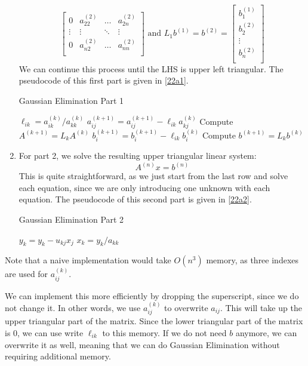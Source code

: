 \documentclass[../main/main.tex]{subfiles}
\begin{document}
\begin{enumerate}
\[\begin{bmatrix}
   0& a_{22}^{(2)} & \ldots & a_{2n}^{(2)}\\
  \vdots & \vdots & \ddots &\vdots \\
  0 & a_{n2}^{(2)} & \ldots & a_{nn}^{(2)}\\
\end{bmatrix}\text{ and  } L_{1}b^{(1)} = b^{(2)} = \begin{bmatrix}
b^{(1)}_{1} \\
b^{(2)}_{2} \\
\vdots \\
b^{(2)}_{n} \\
\end{bmatrix}
        \]
        We can continue this process until the LHS is upper left triangular.
        The pseudocode of this first part is given in \ref{22a1}.
        	\begin{algorithm}[h!]
	\caption{Gaussian Elimination Part 1}
      \label{22a1}
	\begin{algorithmic}[1]
            \State $\ell_{ik} = a_{ik}^{(k)} / a_{kk}^{(k)}$
        \EndFor
                \State $a_{ij}^{(k+1)} = a_{ij}^{(k+1)} - \ell_{ik}a_{kj}^{(k)}$
                \Comment Compute $A^{(k+1)} = L_{k} A^{(k)}$
            \EndFor
        \EndFor
            \State $b_{i}^{(k+1)} = b_{i}^{(k+1)} - \ell_{ik}b_{i}^{(k)}$
            \Comment Compute $b^{(k+1)} = L_{k} b^{(k)}$
        \EndFor
      \EndFor
	\end{algorithmic}
	\end{algorithm}
  \item For part 2, we solve the resulting upper triangular linear system: \[
        A^{(n)} x = b^{(n)}\] This is quite straightforward, as we just start from the last row and solve each equation, since we are only introducing one unknown with each equation.
        The pseudocode of this second part is given in \ref{22a2}.
        	\begin{algorithm}[h!]
	\caption{Gaussian Elimination Part 2}
      \label{22a2}
	\begin{algorithmic}[1]
            \State $y_{k} = y_{k} - u_{kj}x_{j}$
        \EndFor
        \State $x_{k} = y_{k} / a_{k k}$
      \EndFor
	\end{algorithmic}
	\end{algorithm}
\end{enumerate}
\begin{remark}
  Note that a naive implementation would take $O(n^{3})$ memory, as three indexes are used for $a_{ij}^{(k)}$.
\end{remark}
We can implement this more efficiently by dropping the superscript, since we do not change it. In other words, we use $a_{ij}^{(k)}$ to overwrite $a_{ij}$. This will take up the upper triangular part of the matrix. Since the lower triangular part of the matrix is 0, we can use write $\ell_{ik}$ to this memory. If we do not need $b$ anymore, we can overwrite it as well, meaning that we can do Gaussian Elimination without requiring additional memory.
\end{document}

